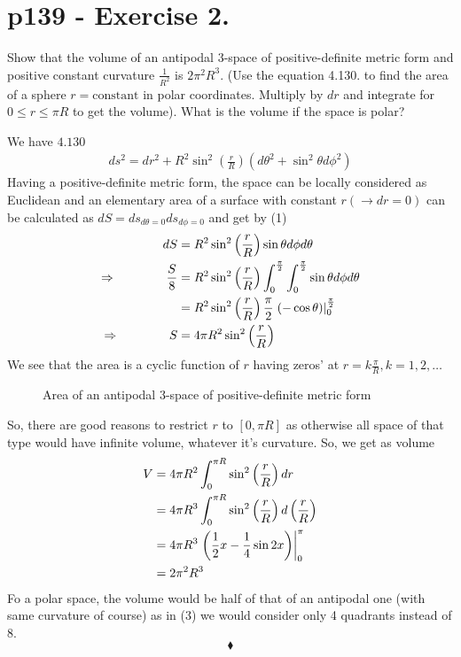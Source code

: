 \section{p139 - Exercise 2.}
\begin{tcolorbox}
Show that the volume of an antipodal 3-space of positive-definite metric form and positive constant curvature $\frac{1}{R^2}$ is $2\pi^2R^3$. (Use the equation 4.130. to find the area of a sphere $r= \text{constant}$ in polar coordinates. Multiply by $dr$ and integrate for $0\leq r \leq \pi R$ to get the volume). What is the volume if the space is polar?
\end{tcolorbox}
We have  $4.130$
\begin{align}
ds^2= dr^2+R^2\sin^2\left(\frac{r}{R}\right)\left(d\theta^2+\sin^2\theta d\phi^2\right)
\end{align}
Having a positive-definite metric form, the space can be locally considered as Euclidean and an elementary area of a  surface with constant $r (\rightarrow dr=0)$ can be calculated as $dS=ds_{d\theta=0}ds_{d\phi=0}$ and get by (1)
\begin{align}
dS &= R^2\sin^2\left(\frac{r}{R}\right)\sin\theta d\phi d\theta\\
\Rightarrow\quad\quad\quad\quad\frac{S}{8} &= R^2\sin^2\left(\frac{r}{R}\right)\int^{\frac{\pi}{2}}_{0}\int^{\frac{\pi}{2}}_{0} \sin\theta d\phi d\theta\\ 
&= R^2\sin^2\left(\frac{r}{R}\right)\frac{\pi}{2} \left.\left(-\cos\theta \right)\right|^{\frac{\pi}{2}}_{0}\\
\Rightarrow\quad\quad\quad\quad S&= 4\pi R^2\sin^2\left(\frac{r}{R}\right)
\end{align}
We see that the area is a cyclic function of $r$ having zeros' at $r= k\frac{\pi}{R }, k=1,2,\dots$
\begin{figure}[H]
\begin{center}

\caption{Area of an antipodal 3-space of positive-definite metric form}
\label{fig:fig_p138_Ex2}
\end{center}
\end{figure}
So, there are good reasons to restrict $r$ to $[0,\pi R]$ as otherwise all space of that type would have infinite volume, whatever it's curvature. So, we get as volume 
\begin{align}
V &= 4\pi R^2\int^{\pi R}_{0}\sin^2\left(\frac{r}{R}\right)dr\\
&= 4\pi R^3\int^{\pi R}_0\sin^2\left(\frac{r}{R}\right)d\left(\frac{r}{R}\right)\\
&= 4\pi R^3\left.\left( \frac{1}{2} x - \frac{1}{4}\sin2x \right)\right|^{\pi}_0\\
&= 2\pi^2 R^3
\end{align}
Fo a polar space, the volume would be half of that of an antipodal one (with same curvature of course) as in (3) we would consider only 4 quadrants instead of 8.
$$\blacklozenge$$
\newpage


